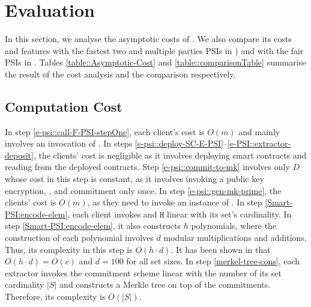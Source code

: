 


\vs

\vs

\section{Evaluation}\label{sec::valuation}

\vs

In this section, we analyse the asymptotic costs of \epsi. We also compare its costs and features with the fastest two and multiple parties PSIs in \cite{AbadiDMT22,DBLP:conf/ccs/KolesnikovMPRT17,NevoTY21,RaghuramanR22}) and with the fair PSIs in \cite{DebnathD16,DBLP:conf/dbsec/DongCCR13}. Tables \ref{table::Asymptotic-Cost} and \ref{table::comparisonTable} summarise the result of the cost analysis and the comparison respectively. 




\vs




\subsection{Computation Cost}

\svs

In step \ref{e-psi::call-F-PSI-stepOne}, each client's cost is $O(m)$ and mainly involves an invocation of \ct. 
% 
In steps \ref{e-psi::deploy-SC-E-PSI}--\ref{e-PSI::extractor-deposit}, the clients' cost is negligible as it involves deploying smart contracts and reading from the deployed contracts. 
%
Step \ref{e-psi::commit-to-mk} involves only $D$ whose cost in this step is constant, as it involves invoking a public key encryption, \prf,  and commitment only once. In step \ref{e-psi::gen-mk-prime}, the clients' cost is  $O(m)$, as they need to invoke an instance of \ct. 
%
In step \ref{Smart-PSI:encode-elem}, each client invokes \prp and $\mathtt{H}$ linear with its set's cardinality. In step \ref{Smart-PSI:encode-elem}, it also constructs $h$ polynomials, where the construction of each polynomial involves $d$  modular multiplications and additions. Thus, its complexity in this step is $O(h\cdot d)$. It has been shown in \cite{AbadiDMT22} that $O(h\cdot d)=O(c)$ and  $d=100$ for all set sizes. 
%
In step \ref{merkel-tree-cons}, each extractor invokes the commitment scheme linear with the number of its set cardinality $|S|$ and constructs a Merkle tree on top of the commitments. Therefore, its complexity is $O(|S|)$. 



